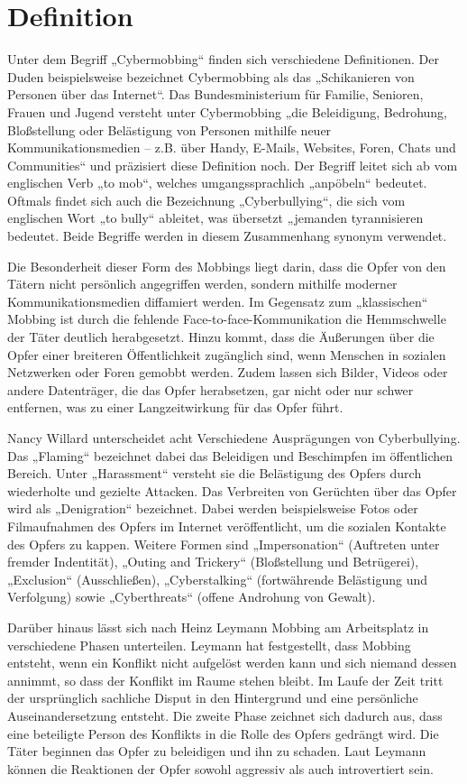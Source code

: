 \section{Definition}
Unter dem Begriff „Cybermobbing“ finden sich verschiedene Definitionen.
Der Duden beispielsweise bezeichnet Cybermobbing als das „Schikanieren von Personen über das Internet“. \cite{DC13}
Das Bundesministerium für Familie, Senioren, Frauen und Jugend versteht unter Cybermobbing „die Beleidigung, Bedrohung, Bloßstellung oder Belästigung von Personen mithilfe neuer Kommunikationsmedien – z.B. über Handy, E-Mails, Websites, Foren, Chats und Communities“ und präzisiert diese Definition noch. \cite{BFS11}
Der Begriff leitet sich ab vom englischen Verb „to mob“, welches umgangssprachlich „anpöbeln“ bedeutet.
Oftmals findet sich auch die Bezeichnung „Cyberbullying“, die sich vom englischen Wort „to bully“ ableitet, was übersetzt „jemanden tyrannisieren bedeutet.
Beide Begriffe werden in diesem Zusammenhang synonym verwendet.

Die Besonderheit dieser Form des Mobbings liegt darin, dass die Opfer von den Tätern nicht persönlich angegriffen werden, sondern mithilfe moderner Kommunikationsmedien diffamiert werden.
Im Gegensatz zum „klassischen“ Mobbing ist durch die fehlende Face-to-face-Kommunikation die Hemmschwelle der Täter deutlich herabgesetzt.
Hinzu kommt, dass die Äußerungen über die Opfer einer breiteren Öffentlichkeit zugänglich sind, wenn Menschen in sozialen Netzwerken oder Foren gemobbt werden.
Zudem lassen sich Bilder, Videos oder andere Datenträger, die das Opfer herabsetzen, gar nicht oder nur schwer entfernen, was zu einer Langzeitwirkung für das Opfer führt.

Nancy Willard unterscheidet acht Verschiedene Ausprägungen von Cyberbullying. \cite{NW08}
Das „Flaming“ bezeichnet dabei das Beleidigen und Beschimpfen im öffentlichen Bereich.
Unter „Harassment“ versteht sie die Belästigung des Opfers durch wiederholte und gezielte Attacken.
Das Verbreiten von Gerüchten über das Opfer wird als „Denigration“ bezeichnet.
Dabei werden beispielsweise Fotos oder Filmaufnahmen des Opfers im Internet veröffentlicht, um die sozialen Kontakte des Opfers zu kappen.
Weitere Formen sind „Impersonation“ (Auftreten unter fremder Indentität), „Outing and Trickery“ (Bloßstellung und Betrügerei), „Exclusion“ (Ausschließen), „Cyberstalking“ (fortwährende Belästigung und Verfolgung) sowie „Cyberthreats“ (offene Androhung von Gewalt).

Darüber hinaus lässt sich nach Heinz Leymann Mobbing am Arbeitsplatz in verschiedene Phasen unterteilen. \cite[S.\,59]{HL93}
Leymann hat festgestellt, dass Mobbing entsteht, wenn ein Konflikt nicht aufgelöst werden kann und sich niemand dessen annimmt, so dass der Konflikt im Raume stehen bleibt.
Im Laufe der Zeit tritt der ursprünglich sachliche Disput in den Hintergrund und eine persönliche Auseinandersetzung entsteht.
Die zweite Phase zeichnet sich dadurch aus, dass eine beteiligte Person des Konflikts in die Rolle des Opfers gedrängt wird.
Die Täter beginnen das Opfer zu beleidigen und ihn zu schaden.
Laut Leymann können die Reaktionen der Opfer sowohl aggressiv als auch introvertiert sein.

